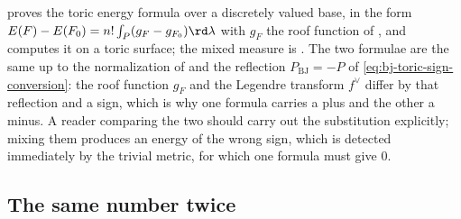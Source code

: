 \begin{remark}
\label{rem:ch46-toric-part3}
 proves the toric energy formula over a
discretely valued base, in the form
$E(F)-E(F_0)=n!\int_P(g_F-g_{F_0})\rd\lambda$ with $g_F$ the roof
function of , and
 computes it on a toric surface; the mixed
measure is .  The two formulae are the
same up to the normalization of  and the
reflection $P_{\mathrm{BJ}}=-P$ of
\eqref{eq:bj-toric-sign-conversion}: the roof function $g_F$ and the
Legendre transform $f^\vee$ differ by that reflection and a sign, which
is why one formula carries a plus and the other a minus.  A reader
comparing the two should carry out the substitution explicitly; mixing them
produces an energy of the wrong sign, which is detected immediately by the
trivial metric, for which one formula must give $0$.
\end{remark}

\subsection{The same number twice}
\label{sec:ch46-same-number}

